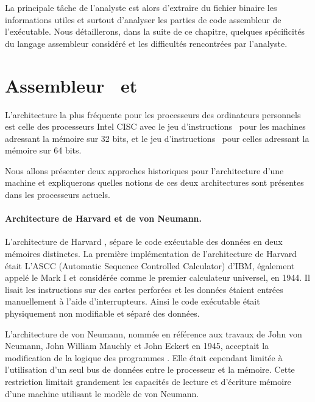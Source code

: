 La principale tâche de l'analyste est alors d'extraire du fichier binaire les informations utiles et surtout d'analyser les parties de code assembleur de l'exécutable. Nous détaillerons, dans la suite de ce chapitre, quelques spécificités du langage assembleur considéré et les difficultés rencontrées par l'analyste.

\label{section:assembleur}
\section{Assembleur \xq\ et \xs}
L'architecture la plus fréquente pour les processeurs des ordinateurs personnels est celle des processeurs Intel CISC avec le jeu d'instructions \xq\ pour les machines adressant la mémoire sur 32 bits, et le jeu d'instructions \xs\ pour celles adressant la mémoire sur 64 bits.

Nous allons présenter deux approches historiques pour l'architecture d'une machine et expliquerons quelles notions de ces deux architectures sont présentes dans les processeurs actuels.

\paragraph{Architecture de Harvard et de von Neumann.}
L'architecture de Harvard \cite{ibm_mark1}, sépare le code exécutable des données en deux mémoires distinctes.
La première implémentation de l'architecture de Harvard était L’ASCC (Automatic Sequence Controlled Calculator) d'IBM, également appelé le Mark I et considérée comme le premier calculateur universel, en 1944. 
Il lisait les instructions sur des cartes perforées et les données étaient entrées manuellement à l'aide d'interrupteurs. 
Ainsi le code exécutable était physiquement non modifiable et séparé des données. 

L'architecture de von Neumann, nommée en référence aux travaux de John von Neumann, John William Mauchly et John Eckert en 1945, acceptait la modification de la logique des programmes \cite{timsit}.
Elle était cependant limitée à l'utilisation d'un seul bus de données entre le processeur et la mémoire.
Cette restriction limitait grandement les capacités de lecture et d'écriture mémoire d'une machine utilisant le modèle de von Neumann.

